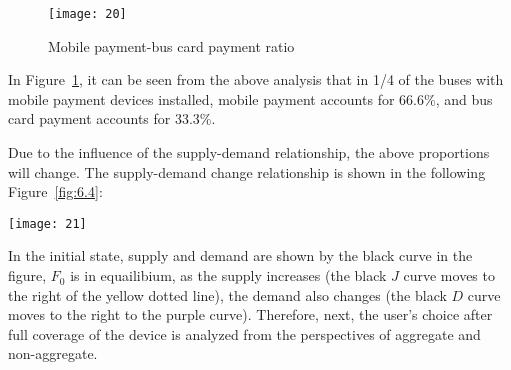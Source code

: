 \documentclass[../mcmpaper]{subfiles}
\begin{document}
\begin{figure}[!ht]
\centering
\texttt{[image: 20]}
\caption{Mobile payment-bus card payment ratio}
\label{fig:6.3}
\end{figure}
\par
In Figure~\ref{fig:6.3}, it can be seen from the above analysis that in 1/4 of the buses with mobile payment devices installed, mobile payment accounts for 66.6\%, and bus card payment accounts for 33.3\%.
\par
Due to the influence of the supply-demand relationship, the above proportions will change. The supply-demand change relationship is shown in the following Figure~\ref{fig:6.4}:\\
\begin{minipage}{1.0\linewidth}
\centering
\texttt{[image: 21]}
\label{fig:6.4}
\end{minipage}
\par
In the initial state, supply and demand are shown by the black curve in the figure, $F_0$ is in equailibium, as the supply increases (the black $J$ curve moves to the right of the yellow dotted line), the demand also changes (the black $D$ curve moves to the right to the purple curve). Therefore, next, the user's choice after full coverage of the device is analyzed from the perspectives of aggregate and non-aggregate.
\end{document}
